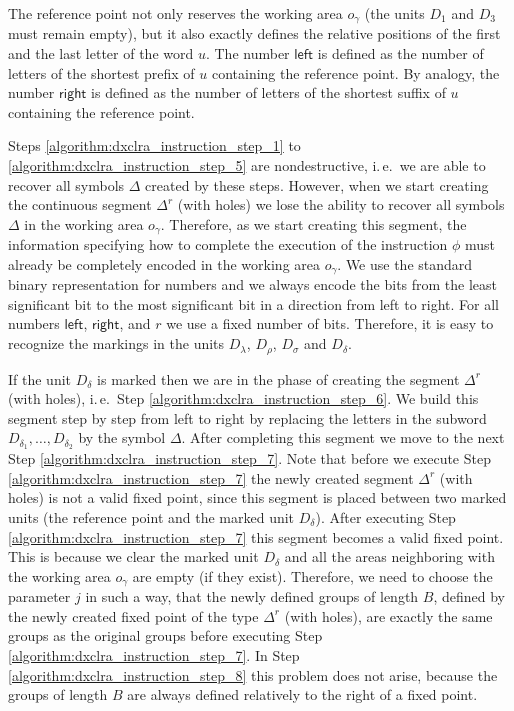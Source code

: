 The reference point not only reserves the working area $o_{\gamma}$ (the units $D_1$ and $D_3$ must remain empty), but it also exactly defines the relative positions of the first and the last letter of the word $u$. The number $\textsf{left}$ is defined as the number of letters of the shortest prefix of $u$ containing the reference point. By analogy, the number $\textsf{right}$ is defined as the number of letters of the shortest suffix of $u$ containing the reference point.

Steps \ref{algorithm:dxclra_instruction_step_1} to \ref{algorithm:dxclra_instruction_step_5} are nondestructive, i.\,e.\ we are able to recover all symbols $\Delta$ created by these steps. However, when we start creating the continuous segment $\Delta^r$ (with holes) we lose the ability to recover all symbols $\Delta$ in the working area $o_{\gamma}$. Therefore, as we start creating this segment, the information specifying how to complete the execution of the instruction $\phi$ must already be completely encoded in the working area $o_{\gamma}$. We use the standard binary representation for numbers and we always encode the bits from the least significant bit to the most significant bit in a direction from left to right. For all numbers $\textsf{left}$, $\textsf{right}$, and $r$ we use a fixed number of bits. Therefore, it is easy to recognize the markings in the units $D_{\lambda}$, $D_{\rho}$, $D_{\sigma}$ and $D_{\delta}$.

If the unit $D_{\delta}$ is marked then we are in the phase of creating the segment $\Delta^r$ (with holes), i.\,e.\ Step \ref{algorithm:dxclra_instruction_step_6}. We build this segment step by step from left to right by replacing the letters in the subword $D_{\delta_1}, \ldots, D_{\delta_2}$ by the symbol $\Delta$. After completing this segment we move to the next Step \ref{algorithm:dxclra_instruction_step_7}. Note that before we execute Step \ref{algorithm:dxclra_instruction_step_7} the newly created segment $\Delta^r$ (with holes) is not a valid fixed point, since this segment is placed between two marked units (the reference point and the marked unit  $D_{\delta}$). After executing Step \ref{algorithm:dxclra_instruction_step_7} this segment becomes a valid fixed point. This is because we clear the marked unit $D_{\delta}$ and all the areas neighboring with the working area $o_{\gamma}$ are empty (if they exist). Therefore, we need to choose the parameter $j$ in such a way, that the newly defined groups of length $B$, defined by the newly created fixed point of the type $\Delta^r$ (with holes), are exactly the same groups as the original groups before executing Step \ref{algorithm:dxclra_instruction_step_7}. In Step \ref{algorithm:dxclra_instruction_step_8} this problem does not arise, because the groups of length $B$  are always defined relatively to the right of a fixed point.

